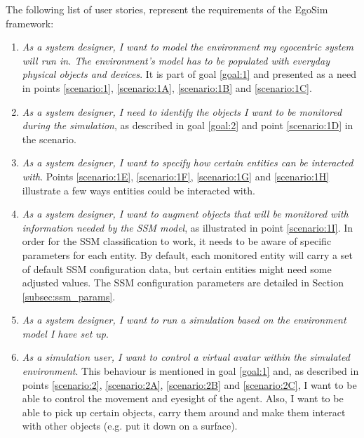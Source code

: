 The following list of user stories, represent the requirements of the EgoSim framework:
\begin{enumerate}
	\item[\textlabel{1.}{us:1}] \emph{As a system designer, I want to model the environment my egocentric system will run in. The environment's model has to be populated with everyday physical objects and devices}. It is part of goal \ref{goal:1} and presented as a need in points \ref{scenario:1}, \ref{scenario:1A}, \ref{scenario:1B} and \ref{scenario:1C}.

	\item[\textlabel{2.}{us:2}] \emph{As a system designer, I need to identify the objects I want to be monitored during the simulation}, as described in goal \ref{goal:2} and point \ref{scenario:1D} in the scenario.

	\item[\textlabel{2.1}{us:2.1}] \emph{As a system designer, I want to specify how certain entities can be interacted with}. Points \ref{scenario:1E}, \ref{scenario:1F}, \ref{scenario:1G} and \ref{scenario:1H} illustrate a few ways entities could be interacted with.

	\item[\textlabel{2.2.}{us:2.2}] \emph{As a system designer, I want to augment objects that will be monitored with information needed by the SSM model}, as illustrated in point \ref{scenario:1I}. In order for the SSM classification to work, it needs to be aware of specific parameters for each entity. By default, each monitored entity will carry a set of default SSM configuration data, but certain entities might need some adjusted values. The SSM configuration parameters are detailed in Section \ref{subsec:ssm_params}.

	\item[\textlabel{3.}{us:3}] \emph{As a system designer, I want to run a simulation based on the environment model I have set up}.

	\item[\textlabel{4.}{us:4}] \emph{As a simulation user, I want to control a virtual avatar within the simulated environment}. This behaviour is mentioned in goal \ref{goal:1} and, as described in points \ref{scenario:2}, \ref{scenario:2A}, \ref{scenario:2B} and \ref{scenario:2C}, I want to be able to control the movement and eyesight of the agent. Also, I want to be able to pick up certain objects, carry them around and make them interact with other objects (e.g. put it down on a surface).


\end{enumerate}
